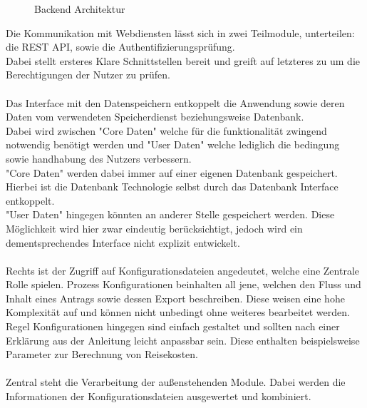 \begin{figure}[h]
    
    \caption{Backend Architektur}\label{fig:BackendArch}
\end{figure}

Die Kommunikation mit Webdiensten lässt sich in zwei Teilmodule, unterteilen: die \ac{REST} \ac{API},
sowie die Authentifizierungsprüfung.\\
Dabei stellt ersteres Klare Schnittstellen bereit und greift auf letzteres zu um die Berechtigungen der Nutzer zu prüfen.\\
\\
Das Interface mit den Datenspeichern entkoppelt die Anwendung sowie deren Daten vom verwendeten Speicherdienst beziehungsweise
Datenbank.\\
Dabei wird zwischen "Core Daten" welche für die funktionalität zwingend notwendig benötigt werden
und "User Daten" welche lediglich die bedingung sowie handhabung des Nutzers verbessern.\\
"Core Daten" werden dabei immer auf einer eigenen Datenbank gespeichert.
Hierbei ist die Datenbank Technologie selbst durch das Datenbank Interface entkoppelt.\\
"User Daten" hingegen könnten an anderer Stelle gespeichert werden.
Diese Möglichkeit wird hier zwar eindeutig berücksichtigt, jedoch wird ein dementsprechendes Interface nicht explizit entwickelt.
\\\\
Rechts ist der Zugriff auf Konfigurationsdateien angedeutet, welche eine Zentrale Rolle spielen.
Prozess Konfigurationen beinhalten all jene, welchen den Fluss und Inhalt eines Antrags sowie dessen Export beschreiben.
Diese weisen eine hohe Komplexität auf und können nicht unbedingt ohne weiteres bearbeitet werden.
Regel Konfigurationen hingegen sind einfach gestaltet und sollten nach einer Erklärung aus der Anleitung leicht anpassbar sein.
Diese enthalten beispielsweise Parameter zur Berechnung von Reisekosten.
\\\\
Zentral steht die Verarbeitung der außenstehenden Module.
Dabei werden die Informationen der Konfigurationsdateien ausgewertet und kombiniert.

